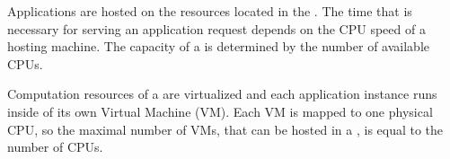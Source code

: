 
Applications are hosted on the resources located in the \dcs{}.
The time that is necessary for serving an application request depends on the CPU speed of a hosting machine.
The capacity of a \dc{} is determined by the number of available CPUs. 


Computation resources of a \dc{} are virtualized and each application instance runs inside of its own Virtual Machine (VM). Each VM is mapped to one physical CPU, so the maximal number of VMs, that can be hosted in a \dc{}, is equal to the number of CPUs.

